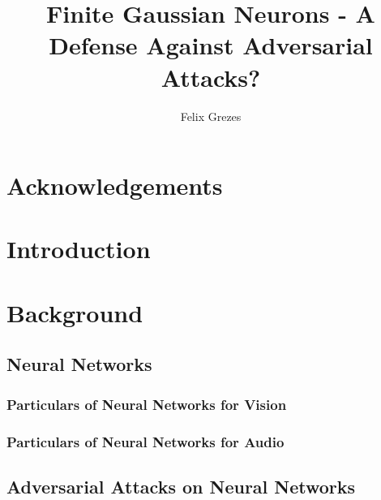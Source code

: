 \documentclass[12pt,oneside]{CUNY_PhD}
\title{Finite Gaussian Neurons - A Defense Against Adversarial Attacks?}
\author{Felix Grezes}
\begin{document}
\frontmatter

\maketitle %

\makecopyrightpage




\chapter*{Acknowledgements}

\tableofcontents

\mainmatter

\chapter{Introduction}

\chapter{Background}
\section{Neural Networks}
\subsection{Particulars of Neural Networks for Vision}
\subsection{Particulars of Neural Networks for Audio}

\section{Adversarial Attacks on Neural Networks}
\end{document}
